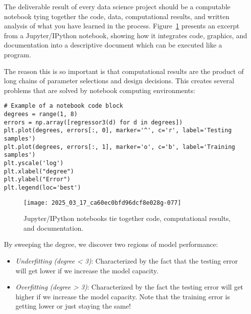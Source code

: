 \documentclass[10pt]{article}
\begin{document}
The deliverable result of every data science project should be a computable notebook tying together the code, data, computational results, and written analysis of what you have learned in the process. Figure~\ref{fig:jupyter} presents an excerpt from a Jupyter/IPython notebook, showing how it integrates code, graphics, and documentation into a descriptive document which can be executed like a program.

The reason this is so important is that computational results are the product of long chains of parameter selections and design decisions. This creates several problems that are solved by notebook computing environments:

\begin{verbatim}
# Example of a notebook code block
degrees = range(1, 8)
errors = np.array([regressor3(d) for d in degrees])
plt.plot(degrees, errors[:, 0], marker='^', c='r', label='Testing samples')
plt.plot(degrees, errors[:, 1], marker='o', c='b', label='Training samples')
plt.yscale('log')
plt.xlabel("degree")
plt.ylabel("Error")
plt.legend(loc='best')
\end{verbatim}

\begin{figure}[h]
\centering
\texttt{[image: 2025\_03\_17\_ca60ec0bfd96dcf8e028g-077]}
\caption{Jupyter/IPython notebooks tie together code, computational results, and documentation.}
\label{fig:jupyter}
\end{figure}

By sweeping the degree, we discover two regions of model performance:
\begin{itemize}
  \item \textit{Underfitting (degree < 3)}: Characterized by the fact that the testing error will get lower if we increase the model capacity.
  \item \textit{Overfitting (degree > 3)}: Characterized by the fact the testing error will get higher if we increase the model capacity. Note that the training error is getting lower or just staying the same!
\end{itemize}
\end{document}
